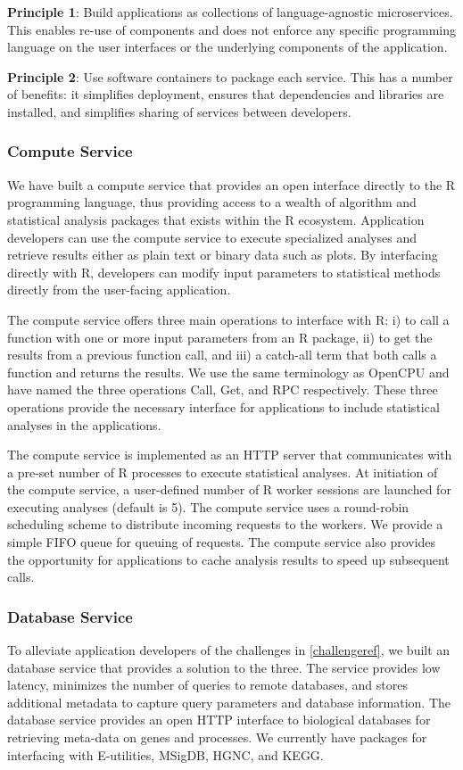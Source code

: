 \textbf{Principle 1}: Build applications as collections of language-agnostic
microservices. This enables re-use of components and does not enforce any
specific programming language on the user interfaces or the underlying
components of the application. 

\textbf{Principle 2}: Use software containers to package each service. This has
a number of benefits: it simplifies deployment, ensures that dependencies and
libraries are installed, and  simplifies sharing of services between
developers. 

\subsubsection{Compute Service}
We have built a compute service that provides an open interface directly to the
R programming language, thus providing access to a wealth of algorithm and
statistical analysis packages that exists within the R ecosystem.  
Application developers can use the compute service to execute specialized
analyses and retrieve results either as plain text or binary data such as plots.
By interfacing directly with R, developers can modify input parameters to
statistical methods directly from the user-facing application. 

The compute service offers three main operations to interface with R: i) to call
a function with one or more input parameters from an R package, ii) to get the
results from a previous function call, and iii) a catch-all term that both calls
a function and returns the results.  We use the same terminology as
OpenCPU\cite{opencpu} and have named the three operations Call, Get, and RPC
respectively. These three operations provide the necessary interface for
applications to include statistical analyses in the applications.

The compute service is implemented as an HTTP server that communicates with a
pre-set number of R processes to execute statistical analyses. 
At initiation of the compute service, a user-defined number of R worker sessions
are launched for executing analyses (default is 5).  
The compute service uses a round-robin scheduling scheme to distribute incoming
requests to the workers. We provide a simple FIFO queue for queuing of requests.
The compute service also provides the opportunity for applications to cache
analysis results to speed up subsequent calls. 

\subsubsection{Database Service} 
To alleviate application developers of the challenges in \ref{challengeref}, we
built an database service that provides a solution to the three. The service
provides low latency, minimizes the number of queries to remote databases, and
stores additional metadata to capture query parameters and database information.
The database service provides an open HTTP interface to biological databases for
retrieving meta-data on genes and processes.  We currently have packages for
interfacing with E-utilities\cite{sayers2009entrez}, MSigDB,
HGNC\cite{gray2014genenames}, and KEGG.

